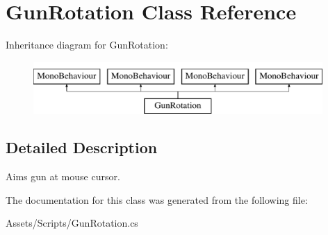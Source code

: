 \hypertarget{class_gun_rotation}{}\section{Gun\+Rotation Class Reference}
\label{class_gun_rotation}
Inheritance diagram for Gun\+Rotation\+:\begin{figure}[H]
\begin{center}
\leavevmode
\includegraphics[height=2.000000cm]{class_gun_rotation}
\end{center}
\end{figure}


\subsection{Detailed Description}
Aims gun at mouse cursor. 

The documentation for this class was generated from the following file\+:\begin{DoxyCompactItemize}
\item 
Assets/\+Scripts/Gun\+Rotation.\+cs\end{DoxyCompactItemize}
